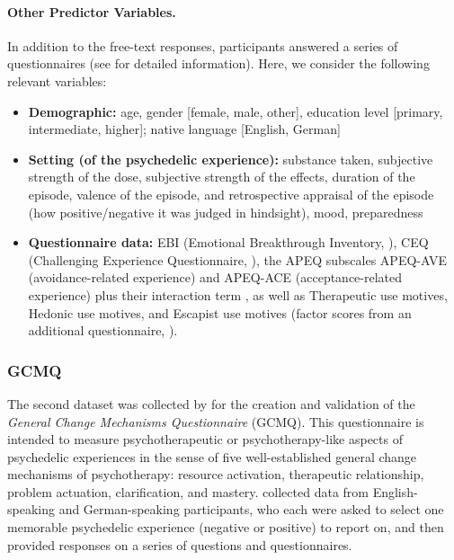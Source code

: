 \documentclass[man,floatsintext]{apa7}
\newcommand{\change}[1]{#1}
\begin{document}
\paragraph{Other Predictor Variables.} In addition to the free-text responses, participants answered a series of questionnaires (see  \cite{wolff2022acceptance} for detailed information). Here, we consider the following relevant variables:
\begin{itemize}
    \item \textbf{Demographic:} age, gender [female, male, other], education level [primary, intermediate, higher]; native language [English, German]
    \item \textbf{Setting (of the psychedelic experience):} substance taken, subjective strength of the dose, \change{subjective strength of the effects}, duration of the episode, valence of the episode, \change{and retrospective appraisal of the episode (how positive/negative it was judged in hindsight)}, mood, preparedness
    \item \textbf{Questionnaire data:} EBI (Emotional Breakthrough Inventory, \cite{roseman2019emotional}), CEQ (Challenging Experience Questionnaire, \cite{barrett2016challenging,dworatzyk2022phenomenological}), the  APEQ \parencite{wolff2022acceptance} subscales     APEQ-AVE (avoidance-related experience) and APEQ-ACE (acceptance-related experience) \change{plus their interaction term \parencite{wolff2022acceptance}}, \change{as well as Therapeutic use motives, Hedonic use motives, and Escapist use motives (factor scores from an additional questionnaire, \cite{wolff2022acceptance}).} 
    
\end{itemize}

\subsubsection{GCMQ}

The second dataset was collected by \textcite{wolff2024measuring} for the creation and validation of the \emph{General Change Mechanisms Questionnaire} (GCMQ). This questionnaire is \change{intended to measure psychotherapeutic or psychotherapy-like aspects of psychedelic experiences in the sense of five well-established general change mechanisms of psychotherapy:} resource activation, therapeutic relationship, problem actuation, clarification, and mastery.\textcite{wolff2024measuring} collected data from  English-speaking and  German-speaking participants, who each were asked to select one memorable psychedelic experience (negative or positive) to report on, and then provided responses on a series of questions and questionnaires. 
\end{document}
